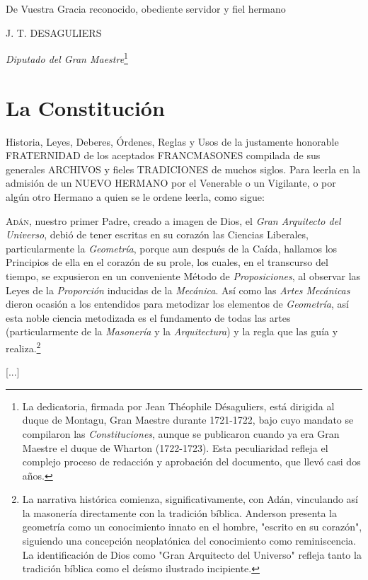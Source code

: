\documentclass[a4paper,12pt,twoside]{book}
\newcommand{\manuscritosection}[1]{%
\section*{#1}
\addcontentsline{toc}{section}{#1}
}
\begin{document}
De Vuestra Gracia reconocido, obediente servidor y fiel hermano

J. T. DESAGULIERS

\textit{Diputado del Gran Maestre}\footnote{La dedicatoria, firmada por Jean Théophile Désaguliers, está dirigida al duque de Montagu, Gran Maestre durante 1721-1722, bajo cuyo mandato se compilaron las \textit{Constituciones}, aunque se publicaron cuando ya era Gran Maestre el duque de Wharton (1722-1723). Esta peculiaridad refleja el complejo proceso de redacción y aprobación del documento, que llevó casi dos años.}

\manuscritosection{La Constitución}

\noindent Historia, Leyes, Deberes, Órdenes, Reglas y Usos de la justamente honorable FRATERNIDAD de los aceptados FRANCMASONES compilada de sus generales ARCHIVOS y fieles TRADICIONES de muchos siglos. Para leerla en la admisión de un NUEVO HERMANO por el Venerable o un Vigilante, o por algún otro Hermano a quien se le ordene leerla, como sigue:

\lettrine[lines=3, lhang=0.1, loversize=0.1]{\textcolor{dorado}{A}}{dán}, nuestro primer Padre, creado a imagen de Dios, el \textit{Gran Arquitecto del Universo}, debió de tener escritas en su corazón las Ciencias Liberales, particularmente la \textit{Geometría}, porque aun después de la Caída, hallamos los Principios de ella en el corazón de su prole, los cuales, en el transcurso del tiempo, se expusieron en un conveniente Método de \textit{Proposiciones}, al observar las Leyes de la \textit{Proporción} inducidas de la \textit{Mecánica}. Así como las \textit{Artes Mecánicas} dieron ocasión a los entendidos para metodizar los elementos de \textit{Geometría}, así esta noble ciencia metodizada es el fundamento de todas las artes (particularmente de la \textit{Masonería} y la \textit{Arquitectura}) y la regla que las guía y realiza.\footnote{La narrativa histórica comienza, significativamente, con Adán, vinculando así la masonería directamente con la tradición bíblica. Anderson presenta la geometría como un conocimiento innato en el hombre, "escrito en su corazón", siguiendo una concepción neoplatónica del conocimiento como reminiscencia. La identificación de Dios como "Gran Arquitecto del Universo" refleja tanto la tradición bíblica como el deísmo ilustrado incipiente.}

\vspace{0.5cm}

[...]
\vspace{0.5cm}
\end{document}
